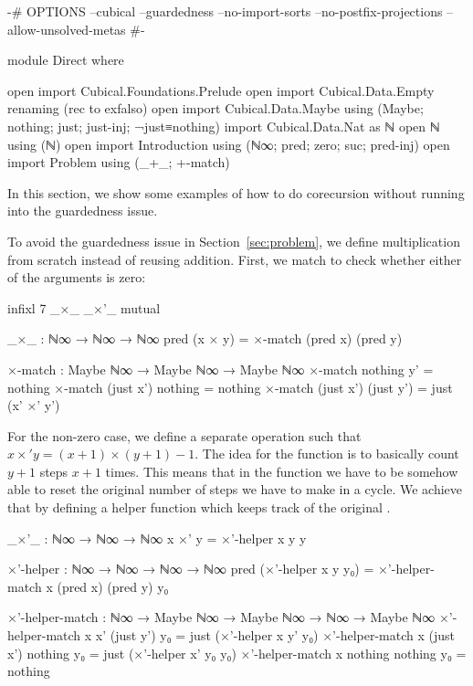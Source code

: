 \begin{code}[hide]
{-# OPTIONS --cubical --guardedness --no-import-sorts --no-postfix-projections --allow-unsolved-metas #-}

module Direct where

open import Cubical.Foundations.Prelude
open import Cubical.Data.Empty
  renaming (rec to exfalso)
open import Cubical.Data.Maybe using (Maybe; nothing; just; just-inj; ¬just≡nothing)
import Cubical.Data.Nat as ℕ
open ℕ using (ℕ)
open import Introduction using (ℕ∞; pred; zero; suc; pred-inj)
open import Problem using (_+_; +-match)
\end{code}
In this section, we show some examples of how to do corecursion without running
into the guardedness issue.

To avoid the guardedness issue in Section~\ref{sec:problem}, we define
multiplication from scratch instead of reusing addition. First, we match to
check whether either of the arguments is zero:
\begin{code}[hide]
infixl 7 _×_ _×'_
mutual
\end{code}
\begin{code}
  _×_ : ℕ∞ → ℕ∞ → ℕ∞
  pred (x × y) = ×-match (pred x) (pred y)

  ×-match : Maybe ℕ∞ → Maybe ℕ∞ → Maybe ℕ∞
  ×-match nothing    y'         = nothing
  ×-match (just x')  nothing    = nothing
  ×-match (just x')  (just y')  = just (x' ×' y')
\end{code}

For the non-zero case, we define a separate operation 
such that $x\times'y = (x+1)\times(y+1)-1$. The idea for the function is to basically
count $y+1$ steps $x+1$ times. This means that in the function we have to be somehow
able to reset the original number of steps we have to make in a cycle.
We achieve that by defining a helper function which keeps track of the original .

\begin{code}
  _×'_ : ℕ∞ → ℕ∞ → ℕ∞
  x ×' y = ×'-helper x y y

  ×'-helper : ℕ∞ → ℕ∞ → ℕ∞ → ℕ∞
  pred (×'-helper x y y₀) =
    ×'-helper-match x (pred x) (pred y) y₀

  ×'-helper-match :
    ℕ∞ → Maybe ℕ∞ → Maybe ℕ∞ → ℕ∞ →
    Maybe ℕ∞
  ×'-helper-match x x' (just y') y₀ =
    just (×'-helper x y' y₀)
  ×'-helper-match x (just x') nothing y₀ =
    just (×'-helper x' y₀ y₀)
  ×'-helper-match x nothing nothing y₀ =
    nothing
\end{code}

